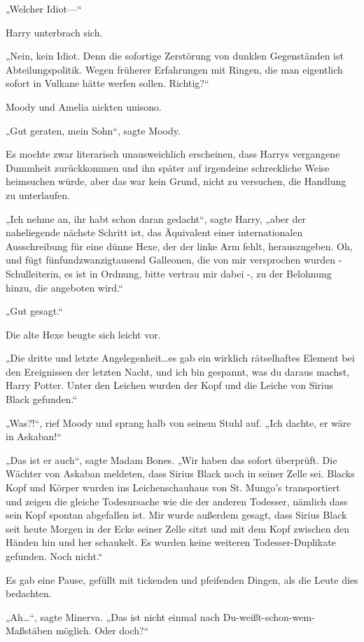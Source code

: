 {„Welcher Idiot—“

Harry unterbrach sich.

„Nein, kein Idiot. Denn die sofortige Zerstörung von dunklen Gegenständen ist Abteilungspolitik. Wegen früherer Erfahrungen mit Ringen, die man eigentlich sofort in Vulkane hätte werfen sollen. Richtig?“

Moody und Amelia nickten unisono.

„Gut geraten, mein Sohn“, sagte Moody.

Es mochte zwar literarisch unausweichlich erscheinen, dass Harrys vergangene Dummheit zurückkommen und ihn später auf irgendeine schreckliche Weise heimsuchen würde, aber das war kein Grund, nicht zu versuchen, die Handlung zu unterlaufen.

„Ich nehme an, ihr habt schon daran gedacht“, sagte Harry, „aber der naheliegende nächste Schritt ist, das Äquivalent einer internationalen Ausschreibung für eine dünne Hexe, der der linke Arm fehlt, herauszugeben. Oh, und fügt fünfundzwanzigtausend Galleonen, die von mir versprochen wurden - Schulleiterin, es ist in Ordnung, bitte vertrau mir dabei -, zu der Belohnung hinzu, die angeboten wird.“

„Gut gesagt.“

Die alte Hexe beugte sich leicht vor.

„Die dritte und letzte Angelegenheit…es gab ein wirklich rätselhaftes Element bei den Ereignissen der letzten Nacht, und ich bin gespannt, was du daraus machst, Harry Potter. Unter den Leichen wurden der Kopf und die Leiche von Sirius Black gefunden.“

„Was?!“, rief Moody und sprang halb von seinem Stuhl auf. „Ich dachte, er wäre in Askaban!“

„Das ist er auch“, sagte Madam Bones. „Wir haben das sofort überprüft. Die Wächter von Askaban meldeten, dass Sirius Black noch in seiner Zelle sei. Blacks Kopf und Körper wurden ins Leichenschauhaus von St. Mungo's transportiert und zeigen die gleiche Todesursache wie die der anderen Todesser, nämlich dass sein Kopf spontan abgefallen ist. Mir wurde außerdem gesagt, dass Sirius Black seit heute Morgen in der Ecke seiner Zelle sitzt und mit dem Kopf zwischen den Händen hin und her schaukelt. Es wurden keine weiteren Todesser-Duplikate gefunden. Noch nicht.“

Es gab eine Pause, gefüllt mit tickenden und pfeifenden Dingen, als die Leute dies bedachten.

„Ah…“, sagte Minerva. „Das ist nicht einmal nach Du-weißt-schon-wem-Maßstäben möglich. Oder doch?“

}
